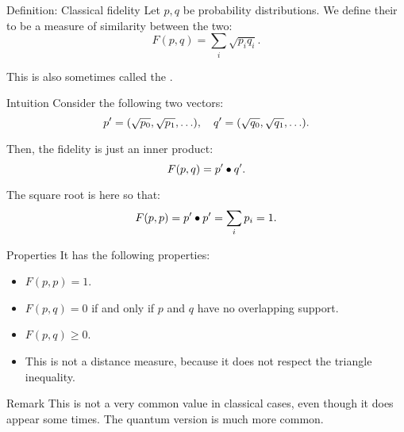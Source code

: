 \documentclass[a4paper]{article}
\begin{document}
\begin{parag}{Definition: Classical fidelity}
    Let $p, q$ be probability distributions. We define their  to be a measure of similarity between the two: 
    \[F\left(p, q\right) = \sum_{i} \sqrt{p_i q_i}.\]

    This is also sometimes called the .

    \begin{subparag}{Intuition}
        Consider the following two vectors: 
        \[p' = \left(\sqrt{p_0}, \sqrt{p_1}, \ldots\right), \mathspace q' = \left(\sqrt{q_0}, \sqrt{q_1}, \ldots\right).\]
        
        Then, the fidelity is just an inner product: 
        \[F\left(p, q\right) = p' \dotprod q'.\]

        The square root is here so that: 
        \[F\left(p, p\right) = p' \dotprod p' = \sum_{i} p_i = 1.\]
    \end{subparag}

    \begin{subparag}{Properties}
        It has the following properties:
        \begin{itemize}
            \item $F\left(p, p\right) = 1$.
            \item $F\left(p, q\right) = 0$ if and only if $p$ and $q$ have no overlapping support.
            \item $F\left(p, q\right) \geq 0$.
            \item This is not a distance measure, because it does not respect the triangle inequality.
        \end{itemize}
    \end{subparag}

    \begin{subparag}{Remark}
        This is not a very common value in classical cases, even though it does appear some times. The quantum version is much more common.
    \end{subparag}
\end{parag}
\end{document}
